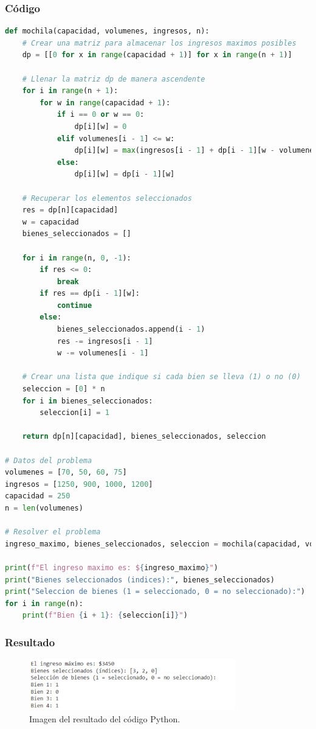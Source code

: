\subsubsection{Código}
\begin{lstlisting}[language=Python]
def mochila(capacidad, volumenes, ingresos, n):
    # Crear una matriz para almacenar los ingresos maximos posibles
    dp = [[0 for x in range(capacidad + 1)] for x in range(n + 1)]

    # Llenar la matriz dp de manera ascendente
    for i in range(n + 1):
        for w in range(capacidad + 1):
            if i == 0 or w == 0:
                dp[i][w] = 0
            elif volumenes[i - 1] <= w:
                dp[i][w] = max(ingresos[i - 1] + dp[i - 1][w - volumenes[i - 1]], dp[i - 1][w])
            else:
                dp[i][w] = dp[i - 1][w]

    # Recuperar los elementos seleccionados
    res = dp[n][capacidad]
    w = capacidad
    bienes_seleccionados = []

    for i in range(n, 0, -1):
        if res <= 0:
            break
        if res == dp[i - 1][w]:
            continue
        else:
            bienes_seleccionados.append(i - 1)
            res -= ingresos[i - 1]
            w -= volumenes[i - 1]

    # Crear una lista que indique si cada bien se lleva (1) o no (0)
    seleccion = [0] * n
    for i in bienes_seleccionados:
        seleccion[i] = 1

    return dp[n][capacidad], bienes_seleccionados, seleccion

# Datos del problema
volumenes = [70, 50, 60, 75]
ingresos = [1250, 900, 1000, 1200]
capacidad = 250
n = len(volumenes)

# Resolver el problema
ingreso_maximo, bienes_seleccionados, seleccion = mochila(capacidad, volumenes, ingresos, n)

print(f"El ingreso maximo es: ${ingreso_maximo}")
print("Bienes seleccionados (indices):", bienes_seleccionados)
print("Seleccion de bienes (1 = seleccionado, 0 = no seleccionado):")
for i in range(n):
    print(f"Bien {i + 1}: {seleccion[i]}")
\end{lstlisting}

\subsubsection{Resultado}
\begin{figure}[H]
    \centering
    \includegraphics[width=0.8\textwidth]{resultado_mochila_ejem2.png}
    \caption{Imagen del resultado del código Python.}
    \label{fig:resultado_ejemplo2}
\end{figure}

